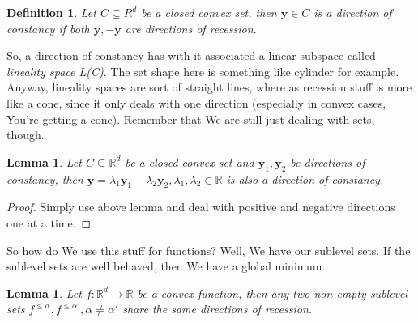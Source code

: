 \documentclass{article}
\newtheorem{definition}[theorem]{Definition}
\newtheorem{lemma}[theorem]{Lemma}
\begin{document}
		\begin{definition}
			Let $C\subseteq{R}^d$ be a closed convex set, then $\mathbf{y}\in C$ is a \textnormal{direction of constancy} if both $\mathbf{y, -y}$ are directions of recession.
		\end{definition}
		
		So, a direction of constancy has with it associated a linear subspace called \textit{lineality space L(C)}. The set shape here is something like cylinder for example. Anyway, lineality spaces are sort of straight lines, where as recession stuff is more like a cone, since it only deals with one direction (especially in convex cases, You're getting a cone). Remember that We are still just dealing with sets, though.
		
		\begin{lemma}
			Let $C\subseteq\mathbb{R}^d$ be a closed convex set and $\mathbf{y}_1, \mathbf{y}_2$ be directions of constancy, then $\mathbf{y} = \lambda_1\mathbf{y}_1 + \lambda_2\mathbf{y}_2, \lambda_1, \lambda_2\in\mathbb{R}$ is also a direction of constancy.
		\end{lemma}
		
		\begin{proof}
			Simply use above lemma and deal with positive and negative directions one at a time.
		\end{proof}
		
		So how do We use this stuff for functions? Well, We have our sublevel sets.  If the sublevel sets are well behaved, then We have a global minimum. 
		
		\begin{lemma}
			Let $f:\mathbb{R}^d\to\mathbb{R}$ be a convex function, then any two non-empty sublevel sets $f^{\le\alpha},f^{\le\alpha'}, \alpha\neq\alpha'$ share the same directions of recession.
		\end{lemma}
		
\end{document}
